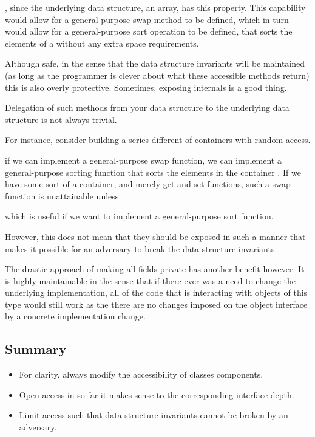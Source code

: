 , since the underlying data structure, an
array, has this property. This capability would allow for a general-purpose
swap method to be defined, which in turn would allow for a general-purpose sort
operation to be defined, that sorts the elements of a 
without any extra space requirements.




Although safe, in the sense that the data structure invariants will be
maintained (as long as the programmer is clever about what these accessible
methods return) this is also overly protective. Sometimes, exposing internals
is a good thing.



Delegation of such methods from your data structure to the underlying data
structure is not always trivial.


For
instance, consider building a series different of containers with random access.


if we can implement a general-purpose swap function, we can implement
a general-purpose sorting function that sorts the elements in the container . If we have some sort of a container, and merely get and set functions, such a swap function is unattainable unless 

 which is useful if we
want to implement a general-purpose sort function.

However, this does not mean that they should be exposed in such a manner that
makes it possible for an adversary to break the data structure invariants.

The drastic approach of making all fields private has another benefit however.
It is highly maintainable in the sense that if there ever was a need to change
the underlying implementation, all of the code that is interacting with objects
of this type would still work as the there are no changes imposed on the object
interface by a concrete implementation change.

\subsection*{Summary}

\begin{itemize}

\item For clarity, always modify the accessibility of classes components.

\item Open access in so far it makes sense to the corresponding interface depth.

\item Limit access such that data structure invariants cannot be broken by an
adversary.

\end{itemize}

